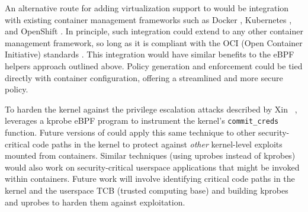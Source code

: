 An alternative route for adding virtualization support to \bpfcontain{} would be integration with existing container management frameworks such as Docker \cite{docker}, Kubernetes \cite{kubernetes}, and OpenShift \cite{openshift}. In principle, such integration could extend to any other container management framework, so long as it is compliant with the OCI (Open Container Initiative) standards \cite{oci}. This integration would have similar benefits to the eBPF helpers approach outlined above. Policy generation and enforcement could be tied directly with container configuration, offering a streamlined and more secure policy.

To harden the kernel against the privilege escalation attacks described by Xin \etal~\cite{xin2018_container_security}, \bpfcontain{} leverages a kprobe eBPF program to instrument the kernel's \texttt{commit\_creds} function. Future versions of \bpfcontain{} could apply this same technique to other security-critical code paths in the kernel to protect against \textit{other} kernel-level exploits mounted from containers. Similar techniques (using uprobes instead of kprobes) would also work on security-critical userspace applications that might be invoked within containers. Future work will involve identifying critical code paths in the kernel and the userspace TCB (trusted computing base) and building \bpfcontain{} kprobes and uprobes to harden them against exploitation.
